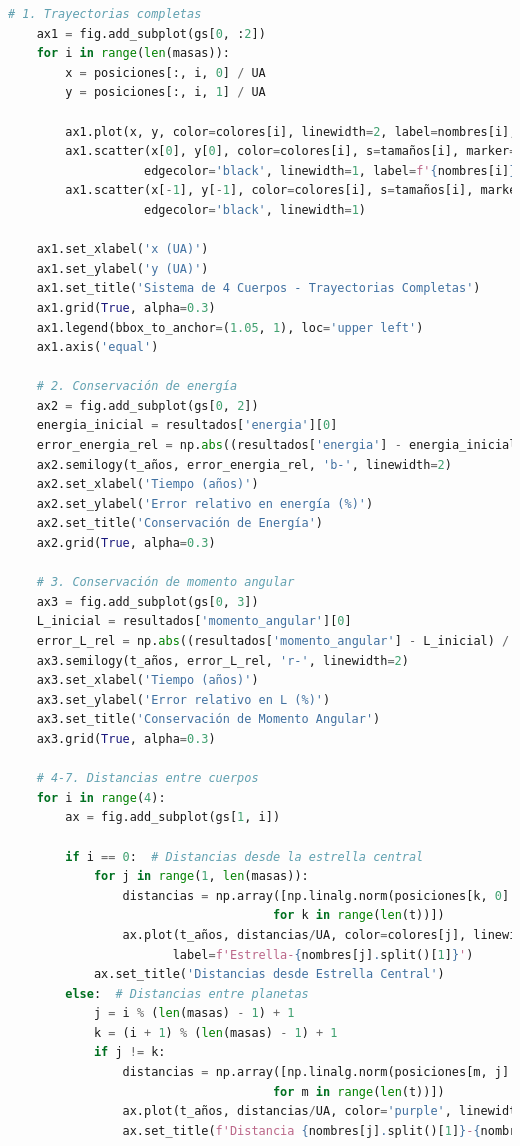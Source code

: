 \documentclass{article}
\begin{document}
\begin{lstlisting}[language=Python, caption={Sistema completo de 4 cuerpos con análisis dinámico}]
    # 1. Trayectorias completas
    ax1 = fig.add_subplot(gs[0, :2])
    for i in range(len(masas)):
        x = posiciones[:, i, 0] / UA
        y = posiciones[:, i, 1] / UA
        
        ax1.plot(x, y, color=colores[i], linewidth=2, label=nombres[i], alpha=0.7)
        ax1.scatter(x[0], y[0], color=colores[i], s=tamaños[i], marker='o', 
                   edgecolor='black', linewidth=1, label=f'{nombres[i]} (inicio)')
        ax1.scatter(x[-1], y[-1], color=colores[i], s=tamaños[i], marker='s',
                   edgecolor='black', linewidth=1)
    
    ax1.set_xlabel('x (UA)')
    ax1.set_ylabel('y (UA)')
    ax1.set_title('Sistema de 4 Cuerpos - Trayectorias Completas')
    ax1.grid(True, alpha=0.3)
    ax1.legend(bbox_to_anchor=(1.05, 1), loc='upper left')
    ax1.axis('equal')
    
    # 2. Conservación de energía
    ax2 = fig.add_subplot(gs[0, 2])
    energia_inicial = resultados['energia'][0]
    error_energia_rel = np.abs((resultados['energia'] - energia_inicial) / energia_inicial) * 100
    ax2.semilogy(t_años, error_energia_rel, 'b-', linewidth=2)
    ax2.set_xlabel('Tiempo (años)')
    ax2.set_ylabel('Error relativo en energía (%)')
    ax2.set_title('Conservación de Energía')
    ax2.grid(True, alpha=0.3)
    
    # 3. Conservación de momento angular
    ax3 = fig.add_subplot(gs[0, 3])
    L_inicial = resultados['momento_angular'][0]
    error_L_rel = np.abs((resultados['momento_angular'] - L_inicial) / L_inicial) * 100
    ax3.semilogy(t_años, error_L_rel, 'r-', linewidth=2)
    ax3.set_xlabel('Tiempo (años)')
    ax3.set_ylabel('Error relativo en L (%)')
    ax3.set_title('Conservación de Momento Angular')
    ax3.grid(True, alpha=0.3)
    
    # 4-7. Distancias entre cuerpos
    for i in range(4):
        ax = fig.add_subplot(gs[1, i])
        
        if i == 0:  # Distancias desde la estrella central
            for j in range(1, len(masas)):
                distancias = np.array([np.linalg.norm(posiciones[k, 0] - posiciones[k, j]) 
                                     for k in range(len(t))])
                ax.plot(t_años, distancias/UA, color=colores[j], linewidth=2, 
                       label=f'Estrella-{nombres[j].split()[1]}')
            ax.set_title('Distancias desde Estrella Central')
        else:  # Distancias entre planetas
            j = i % (len(masas) - 1) + 1
            k = (i + 1) % (len(masas) - 1) + 1
            if j != k:
                distancias = np.array([np.linalg.norm(posiciones[m, j] - posiciones[m, k]) 
                                     for m in range(len(t))])
                ax.plot(t_años, distancias/UA, color='purple', linewidth=2)
                ax.set_title(f'Distancia {nombres[j].split()[1]}-{nombres[k].split()[1]}')
        

\end{lstlisting}
\end{document}
